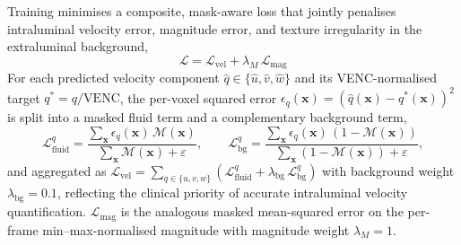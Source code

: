 \documentclass[11pt]{article}
\begin{document}
Training minimises a composite, mask-aware loss that jointly penalises
intraluminal velocity error, magnitude error, and texture irregularity
in the extraluminal background,
\begin{equation}
    \mathcal{L} = \mathcal{L}_{\text{vel}}
                + \lambda_{M}\,\mathcal{L}_{\text{mag}}
\end{equation}
For each predicted velocity component
$\hat{q}\in\{\hat{u},\hat{v},\hat{w}\}$ and its VENC-normalised target
$q^{*}=q/\mathrm{VENC}$, the per-voxel squared error
$\epsilon_q(\mathbf{x})=(\hat{q}(\mathbf{x})-q^{*}(\mathbf{x}))^{2}$ is
split into a masked fluid term and a complementary background term,
\begin{equation}
    \mathcal{L}^{q}_{\text{fluid}}
    = \frac{\sum_{\mathbf{x}} \epsilon_q(\mathbf{x})\,\mathcal{M}(\mathbf{x})}
           {\sum_{\mathbf{x}} \mathcal{M}(\mathbf{x}) + \varepsilon},
    \qquad
    \mathcal{L}^{q}_{\text{bg}}
    = \frac{\sum_{\mathbf{x}} \epsilon_q(\mathbf{x})\,(1-\mathcal{M}(\mathbf{x}))}
           {\sum_{\mathbf{x}} (1-\mathcal{M}(\mathbf{x})) + \varepsilon},
\end{equation}
and aggregated as
$\mathcal{L}_{\text{vel}}
 = \sum_{q\in\{u,v,w\}}
   (\mathcal{L}^{q}_{\text{fluid}}+\lambda_{\text{bg}}\,\mathcal{L}^{q}_{\text{bg}})$
with background weight $\lambda_{\text{bg}}=0.1$, reflecting the
clinical priority of accurate intraluminal velocity quantification.
$\mathcal{L}_{\text{mag}}$ is the analogous masked mean-squared error on
the per-frame min--max-normalised magnitude with magnitude weight
$\lambda_{M}=1$.
\end{document}
